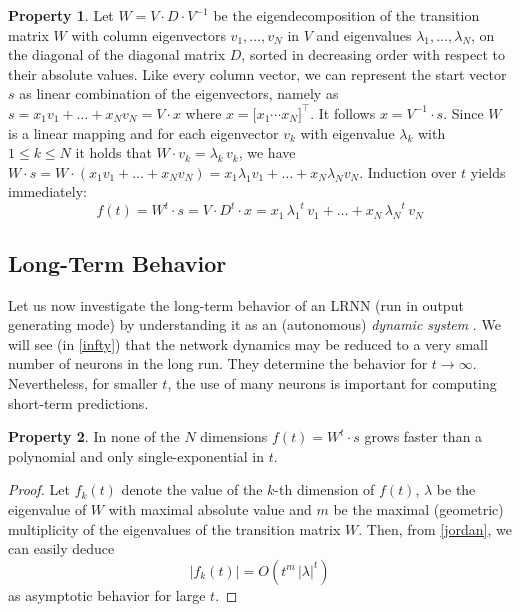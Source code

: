 \documentclass[twoside,11pt]{article}
\theoremstyle{definition}
\newtheorem{prop}{Property}
\begin{document}
\begin{prop}\label{eigen}
Let $W = V \cdot D \cdot V^{-1}$ be the eigendecomposition of the transition matrix $W$ with column
eigenvectors $v_1,\dots,v_N$ in $V$ and eigenvalues $\lambda_1, \dots, \lambda_N$,
on the diagonal of the diagonal matrix $D$, sorted in decreasing order with
respect to their absolute values. Like every column vector, we can represent the
start vector $s$ as linear combination of the eigenvectors, namely as $s =
x_1 v_1 + \dots + x_N v_N = V \cdot x$ where $x = \big[ x_1 \cdots x_N
\big]^\top$. It follows $x = V^{-1} \cdot s$.
Since $W$ is a linear mapping and for each eigenvector $v_k$ with eigenvalue
$\lambda_k$ with $1 \le k \le N$ it holds that $W \cdot v_k = \lambda_k\, v_k$, we
have $W \cdot s = W \cdot (x_1 v_1 + \dots + x_N v_N) = x_1 \lambda_1 v_1 +
\dots + x_N \lambda_N v_N$. Induction over $t$ yields immediately:
\begin{equation}\label{form}
	f(t) = W^t \cdot s = V \cdot D^t \cdot x =
	x_1\,{\lambda_1}^t\,v_1 + \dots + x_N\,{\lambda_N}^t\,v_N
\end{equation}
\end{prop}

\subsection{Long-Term Behavior}\label{ellipse}

Let us now investigate the long-term behavior of an LRNN (run in output generating
mode) by understanding it as an (autonomous) \emph{dynamic system} \citep{CK14,Str15}.
We will see (in \cref{infty}) that the network dynamics may be reduced to a
very small number of neurons in the long run. They determine the behavior for $t
\to \infty$. Nevertheless, for smaller $t$, the use of many neurons is important
for computing short-term predictions.

\begin{prop}\label{exponential}
In none of the $N$ dimensions $f(t) = W^t \cdot s$ grows faster than a
polynomial and only single-exponential in $t$.
\end{prop}

\begin{proof}
Let $f_k(t)$ denote the value of the $k$-th dimension of $f(t)$, $\lambda$ be
the eigenvalue of $W$ with maximal absolute value and $m$ be the maximal (geometric)
multiplicity of the eigenvalues of the transition matrix $W$. Then, from
\cref{jordan}, we can easily deduce \[ |f_k(t)| = O(t^m\,|\lambda|^t) \]
as asymptotic behavior for large $t$.
\end{proof}
\end{document}

